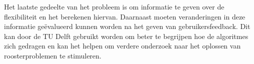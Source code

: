 Het laatste gedeelte van het probleem is om informatie te geven over de flexibiliteit en het berekenen hiervan. Daarnaast moeten veranderingen in deze informatie ge\"evalueerd kunnen worden na het geven van gebruikersfeedback. Dit kan door de TU Delft gebruikt worden om beter te begrijpen hoe de algoritmes zich gedragen en kan het helpen om verdere onderzoek naar het oplossen van roosterproblemen te stimuleren.

